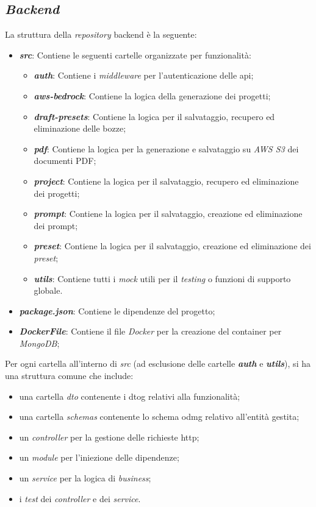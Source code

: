 \subsection{\textit{Backend}}
\label{sez:backend}

La struttura della \textit{repository} \gls{backend} è la seguente:

\begin{itemize}
    \item \textbf{\textit{src}}: Contiene le seguenti cartelle organizzate per funzionalità:
    \begin{itemize}
        \item \textbf{\textit{auth}}: Contiene i \textit{middleware} per l'autenticazione delle \gls{api};
        \item \textbf{\textit{aws-bedrock}}: Contiene la logica della generazione dei progetti;
        \item \textbf{\textit{draft-presets}}: Contiene la logica per il salvataggio, recupero ed eliminazione delle bozze;
        \item \textbf{\textit{pdf}}: Contiene la logica per la generazione e salvataggio su \textit{AWS S3} dei documenti PDF;
        \item \textbf{\textit{project}}: Contiene la logica per il salvataggio, recupero ed eliminazione dei progetti;
        \item \textbf{\textit{prompt}}: Contiene la logica per il salvataggio, creazione ed eliminazione dei \gls{prompt};
        \item \textbf{\textit{preset}}: Contiene la logica per il salvataggio, creazione ed eliminazione dei \textit{preset};
        \item \textbf{\textit{utils}}: Contiene tutti i \textit{mock} utili per il \textit{testing} o funzioni di supporto globale.
    \end{itemize}
    \item \textbf{\textit{package.json}}: Contiene le dipendenze del progetto;
    \item \textbf{\textit{DockerFile}}: Contiene il file \textit{Docker} per la creazione del \gls{container} per \textit{MongoDB};
\end{itemize}

\noindent Per ogni cartella all'interno di \textit{src} (ad esclusione delle cartelle \textbf{\textit{auth}} e \textbf{\textit{utils}}), si ha una struttura comune che include:
\begin{itemize} 
    \item una cartella \textit{dto} contenente i \gls{dtog} relativi alla funzionalità;
    \item una cartella \textit{schemas} contenente lo schema \gls{odmg} relativo all'entità gestita;
    \item un \textit{controller} per la gestione delle richieste \gls{http};
    \item un \textit{module} per l'iniezione delle dipendenze;
    \item un \textit{service} per la logica di \textit{business};
    \item i \textit{test} dei \textit{controller} e dei \textit{service}.
\end{itemize}

